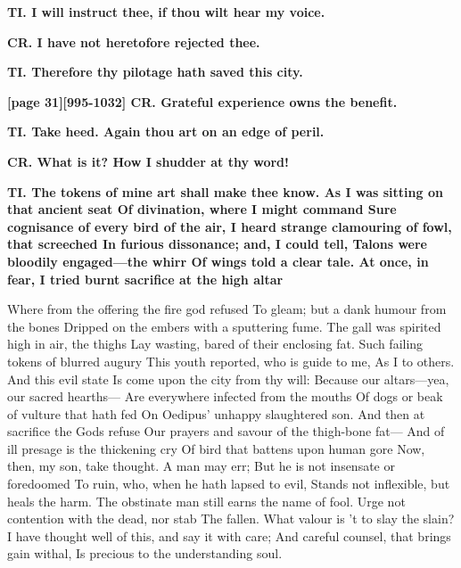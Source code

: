 \documentclass[11pt,letter]{book}
\begin{document}
\par \textbf{TI. I will instruct thee, if thou wilt hear my voice.}
\par 

\par \textbf{CR. I have not heretofore rejected thee.}
\par 

\par \textbf{TI. Therefore thy pilotage hath saved this city.}
\par 

\par \textbf{[page 31][995-1032] CR. Grateful experience owns the benefit.}
\par 

\par \textbf{TI. Take heed. Again thou art on an edge of peril.}
\par 

\par \textbf{CR. What is it? How I shudder at thy word!}
\par 

\par \textbf{TI. The tokens of mine art shall make thee know. As I was sitting on that ancient seat Of divination, where I might command Sure cognisance of every bird of the air, I heard strange clamouring of fowl, that screeched In furious dissonance; and, I could tell, Talons were bloodily engaged—the whirr Of wings told a clear tale. At once, in fear, I tried burnt sacrifice at the high altar}
\par   Where from the offering the fire god refused To gleam; but a dank humour from the bones Dripped on the embers with a sputtering fume. The gall was spirited high in air, the thighs Lay wasting, bared of their enclosing fat. Such failing tokens of blurred augury This youth reported, who is guide to me, As I to others. And this evil state Is come upon the city from thy will:  Because our altars—yea, our sacred hearths— Are everywhere infected from the mouths Of dogs or beak of vulture that hath fed On Oedipus’ unhappy slaughtered son. And then at sacrifice the Gods refuse Our prayers and savour of the thigh-bone fat— And of ill presage is the thickening cry Of bird that battens upon human gore Now, then, my son, take thought. A man may err; But he is not insensate or foredoomed To ruin, who, when he hath lapsed to evil, Stands not inflexible, but heals the harm. The obstinate man still earns the name of fool. Urge not contention with the dead, nor stab The fallen. What valour is ’t to slay the slain? I have thought well of this, and say it with care; And careful counsel, that brings gain withal, Is precious to the understanding soul.
\end{document}
